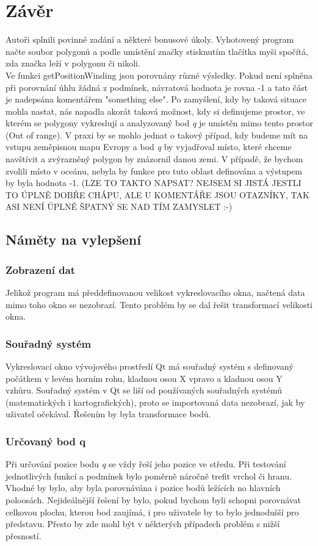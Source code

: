 \documentclass[a4paper, 12pt]{article}
\begin{document}
\clearpage
\section{Závěr}
Autoři splnili povinné zadání a některé bonusové úkoly. Vyhotovený program načte soubor polygonů a podle umístění značky stisknutím tlačítka myši spočítá, zda značka leží v polygonu či nikoli. \\

Ve funkci getPositionWinding jsou porovnány různé výsledky. Pokud není splněna při porovnání úhlu žádná z podmínek, návratová hodnota je rovna -1 a tato část je nadepsána komentářem "something else". Po zamyšlení, kdy by taková situace mohla nastat, nás napadla akorát taková možnost, kdy si definujeme prostor, ve kterém se polygony vykreslují a analyzovaný bod \textit{q} je umístěn mimo tento prostor (Out of range). V praxi by se mohlo jednat o takový případ, kdy budeme mít na vstupu zeměpisnou mapu Evropy a bod \textit{q} by vyjadřoval místo, které chceme navštívit a zvýrazněný polygon by znázornil danou zemi. V případě, že bychom zvolili místo v oceánu, nebyla by funkce pro tuto oblast definována a výstupem by byla hodnota -1. (LZE TO TAKTO NAPSAT? NEJSEM SI JISTÁ JESTLI TO ÚPLNĚ DOBŘE CHÁPU, ALE U KOMENTÁŘE JSOU OTAZNÍKY, TAK ASI NENÍ ÚPLNĚ ŠPATNÝ SE NAD TÍM ZAMYSLET :-)


\subsection{Náměty na vylepšení}
\subsubsection{Zobrazení dat}
Jelikož program má předdefinovanou velikost vykreslovacího okna, načtená data mimo toho okno se nezobrazí. Tento problém by se dal řešit transformací velikosti okna.

\subsubsection{Souřadný systém}
Vykreslovací okno vývojového prostředí Qt má souřadný systém s definovaný počátkem v levém horním rohu,  kladnou osou X vpravo a kladnou osou Y vzhůru. Souřadný systém v Qt se liší od používaných souřadných systémů (matematických i kartografických), proto se importovaná data nezobrazí, jak by uživatel očekával. Řešením by byla transformace bodů.

\subsubsection{Určovaný bod q}
Při určování pozice bodu \textit{q} se vždy řeší jeho pozice ve středu. Při testování jednotlivých funkcí a podmínek bylo poměrně náročně trefit vrchol či hranu. Vhodné by bylo, aby byla porovnávána i pozice bodů ležících no hlavních poloosách. Nejideálnější řešení by bylo, pokud bychom byli schopni porovnávat celkovou plochu, kterou bod zaujímá, i pro uživatele by to bylo jednodušší pro představu. Přesto by zde mohl být v některých případech problém s nižší přesností.
\end{document}

